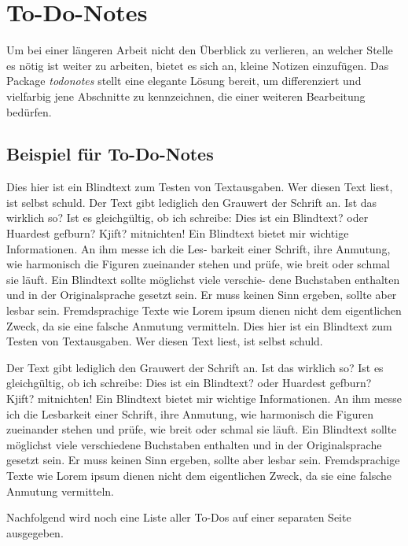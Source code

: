\clearpage\section{To-Do-Notes}
Um bei einer längeren Arbeit nicht den Überblick zu verlieren, an welcher Stelle es nötig ist
weiter zu arbeiten, bietet es sich an, kleine Notizen einzufügen. Das Package \textit{todonotes}
stellt eine elegante Lösung bereit, um differenziert und vielfarbig jene Abschnitte zu kennzeichnen,
die einer weiteren Bearbeitung bedürfen.

\subsection*{Beispiel für To-Do-Notes}
Dies hier ist ein Blindtext zum Testen von Textausgaben. Wer diesen Text liest, ist selbst
 schuld. Der Text gibt lediglich den Grauwert der Schrift an. Ist das wirklich so? Ist es
gleichgültig, ob ich schreibe: Dies ist ein Blindtext? oder Huardest gefburn? Kjift?
mitnichten! Ein Blindtext bietet mir wichtige Informationen. An ihm messe ich die Les-
barkeit einer Schrift, ihre Anmutung, wie harmonisch die Figuren zueinander stehen
und prüfe, wie breit oder schmal sie läuft. Ein Blindtext sollte möglichst viele verschie-
dene Buchstaben enthalten und in der Originalsprache gesetzt sein. Er muss keinen
Sinn ergeben, sollte aber lesbar sein.%
Fremdsprachige Texte wie Lorem ipsum dienen
nicht dem eigentlichen Zweck, da sie eine falsche Anmutung vermitteln. Dies hier ist
ein Blindtext zum Testen von Textausgaben. Wer diesen Text liest, ist selbst schuld. 


Der Text gibt lediglich den Grauwert der Schrift an. Ist das wirklich so? Ist es gleichgültig,
ob ich schreibe: Dies ist ein Blindtext? oder Huardest gefburn? Kjift? mitnichten!
Ein Blindtext bietet mir wichtige Informationen. An ihm messe ich die Lesbarkeit einer
Schrift, ihre Anmutung, wie harmonisch die Figuren zueinander stehen und prüfe, wie
breit oder schmal sie läuft. Ein Blindtext sollte möglichst viele verschiedene Buchstaben
enthalten und in der Originalsprache gesetzt sein. Er muss keinen Sinn ergeben, sollte
aber lesbar sein. Fremdsprachige Texte wie Lorem ipsum dienen nicht dem eigentlichen Zweck, 
da sie eine falsche Anmutung vermitteln.


Nachfolgend wird noch eine Liste aller To-Dos auf einer separaten 
Seite ausgegeben.
    	\listoftodos
